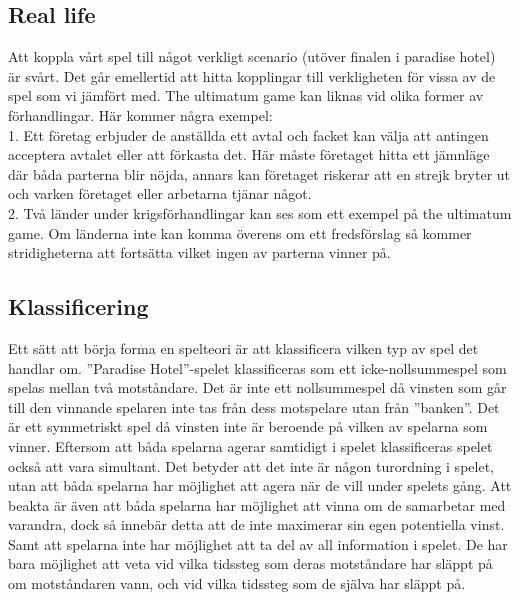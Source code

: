 \subsection{Real life}
\noindent Att koppla vårt spel till något verkligt scenario (utöver finalen i paradise hotel) är svårt. Det går emellertid att hitta kopplingar till verkligheten för vissa av de spel som vi jämfört med. The ultimatum game kan liknas vid olika former av förhandlingar. Här kommer några exempel: \\

1. Ett företag erbjuder de anställda ett avtal och facket kan välja att antingen acceptera avtalet eller att förkasta det. Här måste företaget hitta ett jämnläge där båda parterna blir nöjda, annars kan företaget riskerar att en strejk bryter ut och varken företaget eller arbetarna tjänar något. \\

2. Två länder under krigsförhandlingar kan ses som ett exempel på the ultimatum game. Om länderna inte kan komma överens om ett fredsförslag så kommer stridigheterna att fortsätta vilket ingen av parterna vinner på.\\



\subsection{Klassificering}
\noindent Ett sätt att börja forma en spelteori är att klassificera vilken typ av spel det handlar om. ”Paradise Hotel”-spelet klassificeras som ett icke-nollsummespel som spelas mellan två motståndare. Det är inte ett nollsummespel då vinsten som går till den vinnande spelaren inte tas från dess motspelare utan från ”banken”. Det är ett symmetriskt spel då vinsten inte är beroende på vilken av spelarna som vinner. Eftersom att båda spelarna agerar samtidigt i spelet klassificeras spelet också att vara simultant. Det betyder att det inte är någon turordning i spelet, utan att båda spelarna har möjlighet att agera när de vill under spelets gång. Att beakta är även att båda spelarna har möjlighet att vinna om de samarbetar med varandra, dock så innebär detta att de inte maximerar sin egen potentiella vinst. Samt att spelarna inte har möjlighet att ta del av all information i spelet. De har bara möjlighet att veta vid vilka tidssteg som deras motståndare har släppt på om motståndaren vann, och vid vilka tidssteg som de själva har släppt på.